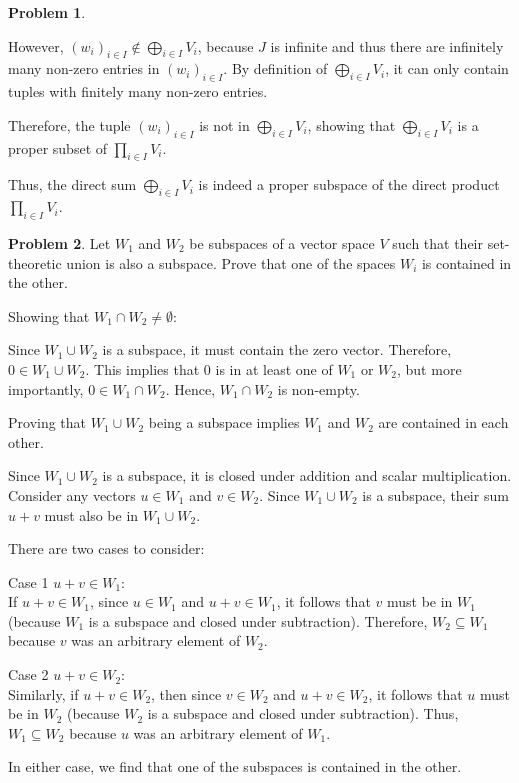 \documentclass[12pt]{article}
\theoremstyle{definition}
\newtheorem{problem}{Problem}
\begin{document}
\begin{problem}
\begin{solution}
            However, \( (w_i)_{i \in I} \notin \bigoplus_{i \in I} V_i \), because \( J \) is infinite and thus there are infinitely many non-zero entries in \( (w_i)_{i \in I} \). By definition of \(\bigoplus_{i \in I} V_i\), it can only contain tuples with finitely many non-zero entries.
    
            Therefore, the tuple \( (w_i)_{i \in I} \) is not in \(\bigoplus_{i \in I} V_i\), showing that \(\bigoplus_{i \in I} V_i\) is a proper subset of \(\prod_{i \in I} V_i\).
    
            Thus, the direct sum \(\bigoplus_{i \in I} V_i\) is indeed a proper subspace of the direct product \(\prod_{i \in I} V_i\).
    

    \end{solution}
\end{problem}

\begin{problem}
    Let $W_1$ and $W_2$ be subspaces of a vector space $V$ such that their
    set-theoretic union is also a subspace. Prove that one of the spaces $W_i$ is contained in the other.

    \begin{solution}    
        Showing that \(W_1 \cap W_2 \neq \emptyset\):
    
        Since \(W_1 \cup W_2\) is a subspace, it must contain the zero vector. Therefore, \(0 \in W_1 \cup W_2\). This implies that \(0\) is in at least one of \(W_1\) or \(W_2\), but more importantly, \(0 \in W_1 \cap W_2\). Hence, \(W_1 \cap W_2\) is non-empty.
    
        Proving that \(W_1 \cup W_2\) being a subspace implies \(W_1\) and \(W_2\) are contained in each other.
    
        Since \(W_1 \cup W_2\) is a subspace, it is closed under addition and scalar multiplication. Consider any vectors \(u \in W_1\) and \(v \in W_2\). Since \(W_1 \cup W_2\) is a subspace, their sum \(u + v\) must also be in \(W_1 \cup W_2\).
    
        There are two cases to consider:
    
        Case 1 \(u + v \in W_1\):\\
        If \(u + v \in W_1\), since \(u \in W_1\) and \(u + v \in W_1\), it follows that \(v\) must be in \(W_1\) (because \(W_1\) is a subspace and closed under subtraction). Therefore, \(W_2 \subseteq W_1\) because \(v\) was an arbitrary element of \(W_2\).
    
        Case 2 \(u + v \in W_2\):\\
        Similarly, if \(u + v \in W_2\), then since \(v \in W_2\) and \(u + v \in W_2\), it follows that \(u\) must be in \(W_2\) (because \(W_2\) is a subspace and closed under subtraction). Thus, \(W_1 \subseteq W_2\) because \(u\) was an arbitrary element of \(W_1\).
    
        In either case, we find that one of the subspaces is contained in the other.
    \end{solution}
\end{problem}
\end{document}
